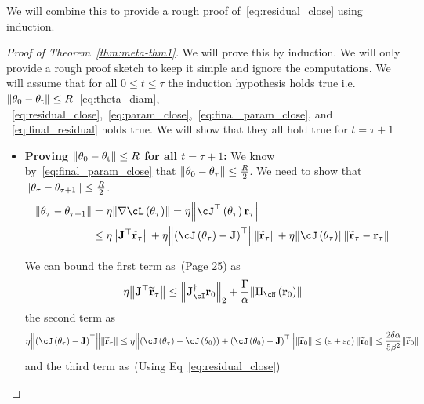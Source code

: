 \documentclass[a4paper]{article}
\let\temp\epsilon
\let\epsilon\varepsilon
\let\varepsilon\temp
\begin{document}
We will combine this to provide a rough proof
of~\ref{eq:residual_close} using induction.

\begin{proof}[Proof of Theorem~\ref{thm:meta-thm1}] We will prove this
  by induction. We will only provide a rough proof sketch to keep it
  simple and ignore the computations. We will assume that for all
  $0\le  t\le \tau$ the induction hypothesis holds true
  i.e. $\mathrm{\left\lVert\theta_0 - \theta_t\right\rVert}\le R$~\ref{eq:theta_diam},
  ~\ref{eq:residual_close},~\ref{eq:param_close},~\ref{eq:final_param_close},
  and ~\ref{eq:final_residual} holds true. We will show that they all
  hold true for $t=\tau+1$
  \begin{itemize}
  \item \textbf{Proving $\mathrm{\left\lVert\theta_0 - \theta_t\right\rVert}\le R$ for all
      $t=\tau+1$:}
    We know by~\eqref{eq:final_param_close} that $\mathrm{\left\lVert\theta_0 -
      \theta_\tau\right\rVert}\le \frac{R}{2}$. We need to show that
    $\mathrm{\left\lVert\theta_\tau - \theta_{\tau+1}\right\rVert}\le\frac{R}{2}$.
    \begin{align*}
      \norm{\theta_\tau - \theta_{\tau+1}} &=
                                             \eta\norm{\nabla\cL\br{\theta_\tau}}
                                             =
                                             \eta\norm{\cJ^\top\br{\theta_\tau}\vec{r}_\tau}\\
                                           &\le
                                             \eta\norm{\vec{J}^\top\widetilde{\vec{r}}_\tau}
                                             +
                                             \eta\norm{\br{\cJ\br{\theta_\tau}
                                             -
                                             \vec{J}}^\top}\norm{\widetilde{\vec{r}}_\tau}
                                             +
                                             \eta\norm{\cJ\br{\theta_\tau}}\norm{\widetilde{\vec{r}}_\tau
                                             - \vec{r}_\tau}\\
    \end{align*}

    We can bound the first term as~(Page 25) as \[
    \eta\norm{\vec{J}^\top\widetilde{\vec{r}}_\tau}\le  \norm{\vec{J}_\cI^\dagger
        \vec{r}_0}_2 +
      \frac{\Gamma}{\alpha}\norm{\Pi_\cN\br{\vec{r}_0}}  \]the second
    term as
    \[ \eta\norm{\br{\cJ\br{\theta_\tau}-
          \vec{J}}^\top}\norm{\widetilde{\vec{r}}_\tau}\le
      \eta\norm{\br{\cJ\br{\theta_\tau}- \cJ\br{\theta_0}}+\br{\cJ\br{\theta_0}-
          \vec{J}}^\top}\norm{\widetilde{\vec{r}}_0}\le\br{\epsilon+\epsilon_0}\norm{\widetilde{\vec{r}}_0}\le\dfrac{2\delta\alpha}{5\beta^2}\norm{\widetilde{\vec{r}}_0}\]
    and the third term as~(Using Eq~\eqref{eq:residual_close})
    

\end{itemize}
\end{proof}
\end{document}
